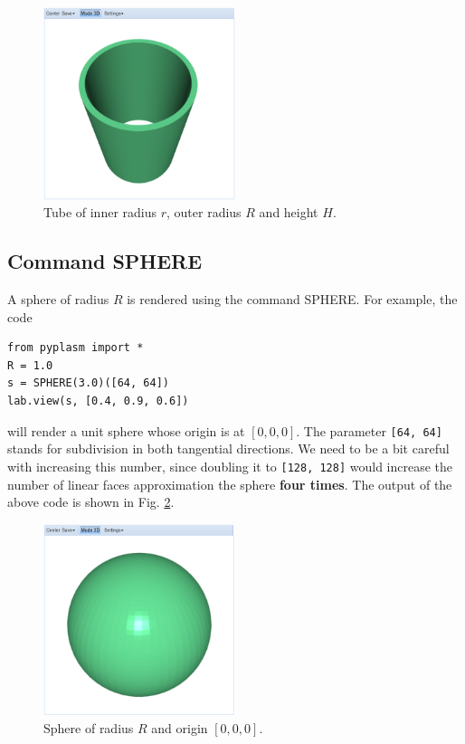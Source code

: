 \documentclass[article,A4,12pt]{llncs}
\begin{document}
\begin{figure}[!ht]
\begin{center}
\includegraphics[width=0.5\textwidth]{img/tube-1.png}
\end{center}
\vspace{-2mm}
\caption{Tube of inner radius $r$, outer radius $R$ and height $H$.}
\label{fig:tube-1}
\end{figure}

\subsection{Command SPHERE}

A sphere of radius $R$ is rendered using the command SPHERE.
For example, the code

\begin{verbatim}
from pyplasm import *
R = 1.0
s = SPHERE(3.0)([64, 64])
lab.view(s, [0.4, 0.9, 0.6])
\end{verbatim}
will render a unit sphere whose origin is at $[0, 0, 0]$. 
The parameter {\tt [64, 64]} stands for 
subdivision in both tangential directions. We need to be a bit 
careful with increasing this number, since doubling it to 
{\tt [128, 128]} would increase 
the number of linear faces approximation the sphere {\bf four times}.
The output of the above code is shown in Fig. \ref{fig:sphere-1}.

\newpage

\begin{figure}[!ht]
\begin{center}
\includegraphics[width=0.5\textwidth]{img/sphere-1.png}
\end{center}
\vspace{-2mm}
\caption{Sphere of radius $R$ and origin $[0, 0, 0]$.}
\label{fig:sphere-1}
\end{figure}
\end{document}
